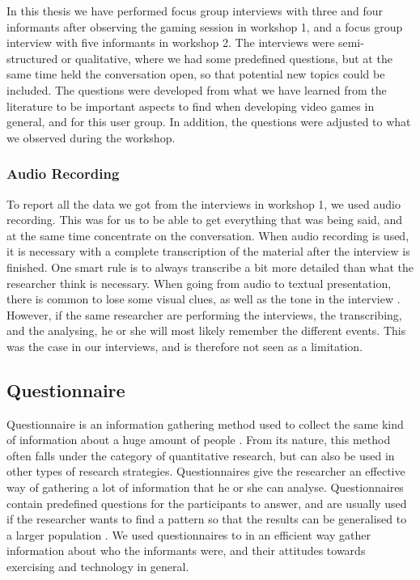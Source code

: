 In this thesis we have performed focus group interviews with three and four informants after observing the gaming session in workshop 1, and a focus group interview with five informants in workshop 2. The interviews were semi-structured or qualitative, where we had some predefined questions, but at the same time held the conversation open, so that potential new topics could be included. The questions were developed from what we have learned from the literature to be important aspects to find when developing video games in general, and for this user group. In addition, the questions were adjusted to what we observed during the workshop. 

\subsubsection{Audio Recording}
To report all the data we got from the interviews in workshop 1, we used audio recording. This was for us to be able to get everything that was being said, and at the same time concentrate on the conversation. When audio recording is used, it is necessary with a complete transcription of the material after the interview is finished. One smart rule is to always transcribe a bit more detailed than what the researcher think is necessary. When going from audio to textual presentation, there is common to lose some visual clues, as well as the tone in the interview \cite{tjora}. However, if the same researcher are performing the interviews, the transcribing, and the analysing, he or she will most likely remember the different events. This was the case in our interviews, and is therefore not seen as a limitation. 

\subsection{Questionnaire}
Questionnaire is an information gathering method used to collect  the same kind of information about a huge amount of people \cite{oates}. From its nature, this method often falls under the category of quantitative research, but can also be used in other types of research strategies. Questionnaires give the researcher an effective way of gathering a lot of information that he or she can analyse. Questionnaires contain predefined questions for the participants to answer, and are usually used if the researcher wants to find a pattern so that the results can be generalised to a larger population  \cite{oates}. We used questionnaires to in an efficient way gather information about  who the informants were, and their attitudes towards exercising and technology in general. 

